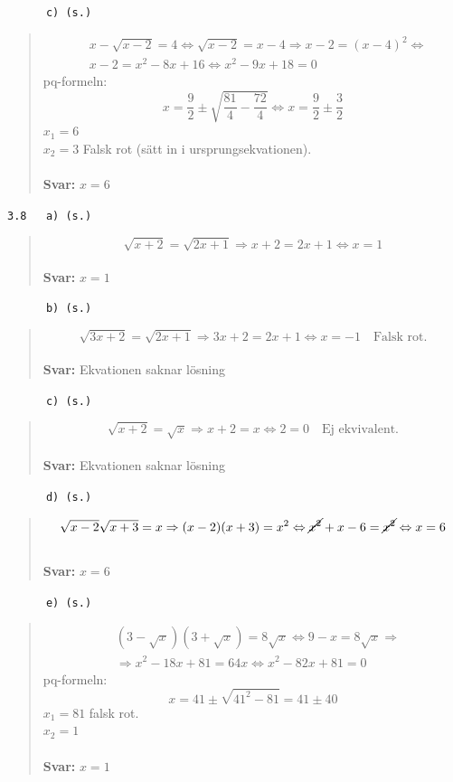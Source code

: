 \documentclass[a4paper]{article}
\newcommand{\tskcol}[1]{\textcolor{tskcol}{#1}}
\begin{document}
	\texttt{\tskcol{~~~~~~c) (s.)}}
	\begin{quotation}
		\noindent
		\begin{align*}
		&x-\sqrt{x-2}=4 \Leftrightarrow
		\sqrt{x-2}=x-4 \Rightarrow
		x-2=(x-4)^2 \Leftrightarrow \\
		&x-2=x^2-8x+16 \Leftrightarrow
		x^2-9x+18=0
		\end{align*}
		pq-formeln: \\
		\[x=\frac{9}{2}\pm\sqrt{\frac{81}{4}-\frac{72}{4}} \Leftrightarrow
		x=\frac{9}{2}\pm\frac{3}{2}\]
		$x_1=6$ \\
		$x_2=3$ Falsk rot (sätt in i ursprungsekvationen).
		\\ \\
		\textbf{Svar:} $x=6$
	\end{quotation}
	
	\texttt{\tskcol{3.8~~~a) (s.)}}
	\begin{quotation}
		\noindent
		\[\sqrt{x+2}=\sqrt{2x+1} \Rightarrow
		x+2=2x+1 \Leftrightarrow
		x=1\]
		\\
		\textbf{Svar:} $x=1$
	\end{quotation}
	
	\pagebreak
	\texttt{\tskcol{~~~~~~b) (s.)}}
	\begin{quotation}
		\noindent
		\[\sqrt{3x+2}=\sqrt{2x+1} \Rightarrow
		3x+2=2x+1 \Leftrightarrow
		x=-1 \text{~~~Falsk rot.}\]
		\\
		\textbf{Svar:} Ekvationen saknar lösning
	\end{quotation}
	
	\texttt{\tskcol{~~~~~~c) (s.)}}
	\begin{quotation}
		\noindent
		\[\sqrt{x+2}=\sqrt{x} \Rightarrow
		x+2=x \Leftrightarrow
		2=0 \text{~~~Ej ekvivalent.}\]
		\\
		\textbf{Svar:} Ekvationen saknar lösning
	\end{quotation}
		
	\texttt{\tskcol{~~~~~~d) (s.)}}
	\begin{quotation}
		\noindent
		\[\sqrt{x-2}\sqrt{x+3}=x \Rightarrow
		(x-2)(x+3)=x^2 \Leftrightarrow
		\cancel{x^2}+x-6=\cancel{x^2} \Leftrightarrow
		x=6\]
		\\
		\textbf{Svar:} $x=6$
	\end{quotation}
	
	\texttt{\tskcol{~~~~~~e) (s.)}}
	\begin{quotation}
		\noindent
		\begin{align*}
		&(3-\sqrt{x})(3+\sqrt{x})=8\sqrt{x} \Leftrightarrow
		9-x=8\sqrt{x} \Rightarrow \\
		&\Rightarrow x^2-18x+81=64x \Leftrightarrow
		x^2-82x+81=0
		\end{align*}
		pq-formeln: \\
		\[x=41\pm\sqrt{41^2-81}=41\pm40\]
		$x_1=81$ falsk rot. \\
		$x_2=1$
		\\ \\
		\textbf{Svar:} $x=1$
	\end{quotation}
		
\end{document}
